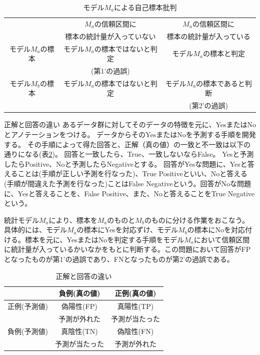 \begin{table}[hbtp]
 \caption{モデル$M_a$による自己標本批判}
 \label{table:type_error}
 \centering
 \begin{tabular}{ccc}
  \hline
  &  $M_a$の信頼区間に &  $M_a$の信頼区間に \\
  & 標本の統計量が入っていない & 標本の統計量が入っている \\
  \hline \hline
  モデル$M_a$の標本  & モデル$M_a$の標本ではないと判定  & モデル$M_a$の標本と判定 \\
  & (第1'の過誤) & \\
  モデル$M_b$の標本  & モデル$M_a$の標本ではないと判定  & モデル$M_a$の標本であると判断 \\
  & & (第2'の過誤) \\
  \hline
 \end{tabular}
\end{table}


\begin{SMbox}{正解と回答の違い}
 あるデータ群に対してそのデータの特徴を元に、YesまたはNoとアノテーションをつける。
 データからそのYesまたはNoを予測する手順を開発する。
 その手順によって得た回答と、正解（真の値）の一致と不一致は以下の通りになる(表\ref{table:Yes_no_answer})。
 回答と一致したら、True、一致しないならFalse。
 Yesと予測したらPositive、Noと予測したらNegativeとする。
 回答がYesな問題に、Yesと答えることは(手順が正しい予測を行なった)、True Positiveといい、Noと答える(手順が間違えた予測を行なった)ことはFalse Negativeという。回答がNoな問題に、Yesと答えることを、False Positive、また、Noと答えることをTrue Negativeという。

統計モデル$M_a$により、標本を$M_a$のものと$M_b$のものに分ける作業をおこなう。 具体的には、モデル$M_a$の標本にYesを対応ずけ、モデル$M_b$の標本にNoを対応付ける。標本を元に、YesまたはNoを判定する手順をモデル$M_a$において信頼区間に統計量が入っているかいなかをもとに判断する。この問題において回答がFPとなったものが第1'の過誤であり、FNとなったものが第2'の過誤である。
\end{SMbox}

\begin{table}[hbtp]
 \caption{正解と回答の違い}
 \label{table:Yes_no_answer}
 \centering
 \begin{tabular}{ccc}
  &  負例(真の値) & 正例(真の値)  \\
  \hline \hline
  正例(予測値) &  偽陽性(FP)  & 真陽性(TP)\\
  &予測が外れた & 予測が当たった\\
  負例(予測値) & 真陰性(TN) & 偽陰性(FN)\\
  & 予測が当たった & 予測が外れた\\
  \hline
 \end{tabular}
\end{table}

